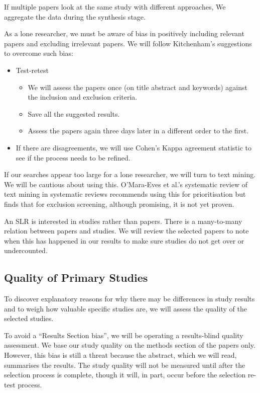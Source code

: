 If multiple papers look at the same study with different approaches, We aggregate the data during the synthesis stage.

As a lone researcher, we must be aware of bias in positively including relevant papers and excluding irrelevant papers.
We will follow Kitchenham's suggestions to overcome such bias:
\begin{itemize}
    \setlength\itemsep{0em}
    \item Test-retest 
    \begin{itemize}
        \setlength\itemsep{0em}
        \item We will assess the papers once (on title abstract and keywords) against the inclusion and exclusion criteria.
        \item Save all the suggested results.
        \item Assess the papers again three days later in a different order to the first.  
    \end{itemize}
    \item If there are disagreements, we will use Cohen's\cite{Cohen_1960} Kappa agreement statistic to see if the process needs to be refined.
\end{itemize} 

If our searches appear too large for a lone researcher, we will turn to text mining.
We will be cautious about using this.
O'Mara-Eves et al.'s\cite{OMara-Eves_2015} systematic review of text mining in systematic reviews recommends using this for prioritisation but finds that for exclusion screening, although promising, it is not yet proven.

An SLR is interested in studies rather than papers.
There is a many-to-many relation between papers and studies.
We will review the selected papers to note when this has happened in our results to make sure studies do not get over or undercounted.

\subsection{Quality of Primary Studies}
To discover explanatory reasons for why there may be differences in study results and to weigh how valuable specific studies are, we will assess the quality of the selected studies.

To avoid a ``Results Section bias'', we will be operating a results-blind quality assessment.
We base our study quality on the methods section of the papers only.
However, this bias is still a threat because the abstract, which we will read, summarises the results.
The study quality will not be measured until after the selection process is complete, though it will, in part, occur before the selection re-test process.

